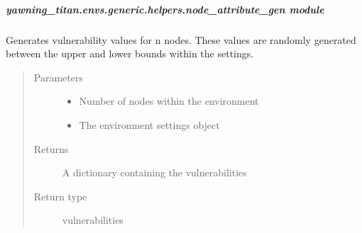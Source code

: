 \documentclass[letterpaper,10pt,english]{sphinxmanual}
\begin{document}
\subparagraph{yawning\_titan.envs.generic.helpers.node\_attribute\_gen module}
\label{\detokenize{source/yawning_titan.envs.generic.helpers:module-yawning_titan.envs.generic.helpers.node_attribute_gen}}\label{\detokenize{source/yawning_titan.envs.generic.helpers:yawning-titan-envs-generic-helpers-node-attribute-gen-module}}

\begin{fulllineitems}
\label{\detokenize{source/yawning_titan.envs.generic.helpers:yawning_titan.envs.generic.helpers.node_attribute_gen.generate_vulnerabilities}}
\sphinxAtStartPar
Generates vulnerability values for n nodes. These values are
randomly generated between the upper and lower bounds within the
settings.
\begin{quote}\begin{description}
\item[{Parameters}] \leavevmode\begin{itemize}
\item {}
\sphinxAtStartPar
{} \textendash{} Number of nodes within the environment

\item {}
\sphinxAtStartPar
{} \textendash{} The environment settings object

\end{itemize}

\item[{Returns}] \leavevmode
\sphinxAtStartPar
A dictionary containing the vulnerabilities

\item[{Return type}] \leavevmode
\sphinxAtStartPar
vulnerabilities

\end{description}\end{quote}

\end{fulllineitems}
\end{document}
